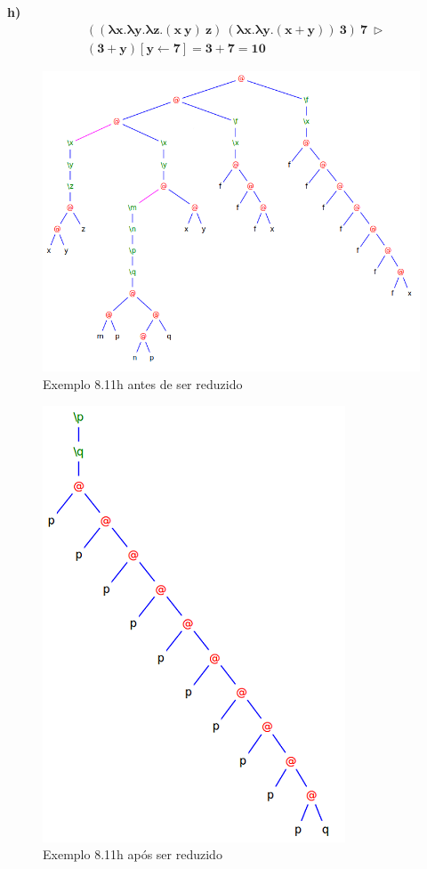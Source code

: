 \documentclass[a4paper]{article}
\begin{document}
\FloatBarrier

\textbf{h)}
\begin{align*}
&\mathbf{((\lambda x.\lambda y.\lambda z.(x\ y)\ z)\ (\lambda x.\lambda y.(x + y))\ 3)\ 7\ \rhd} \\
&\mathbf{(3 + y) [y \leftarrow 7] = 3 + 7 = 10}
\end{align*}

\begin{figure}[h]
  \centering
  \includegraphics[scale=0.45]{8-11h_1.png}
  \caption{Exemplo 8.11h antes de ser reduzido}
\end{figure}

\begin{figure}[h]
  \centering
  \includegraphics[scale=0.45]{8-11h_2.png}
  \caption{Exemplo 8.11h após  ser reduzido}
\end{figure}

\FloatBarrier
\end{document}
